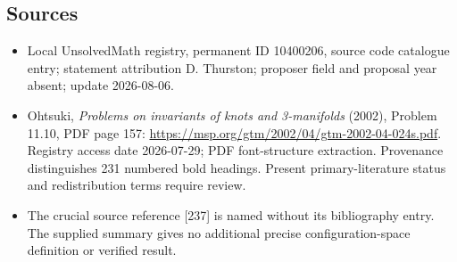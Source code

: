 \documentclass[11pt]{article}
\begin{document}
\subsection{Sources}
\begin{itemize}
\item Local UnsolvedMath registry, permanent ID 10400206, source code catalogue entry; statement attribution D. Thurston; proposer field and proposal year absent; update 2026-08-06.
\item Ohtsuki, \emph{Problems on invariants of knots and 3-manifolds} (2002), Problem 11.10, PDF page 157: \url{https://msp.org/gtm/2002/04/gtm-2002-04-024s.pdf}. Registry access date 2026-07-29; PDF font-structure extraction. Provenance distinguishes 231 numbered bold headings. Present primary-literature status and redistribution terms require review.
\item The crucial source reference [237] is named without its bibliography entry. The supplied summary gives no additional precise configuration-space definition or verified result.
\end{itemize}
\end{document}
